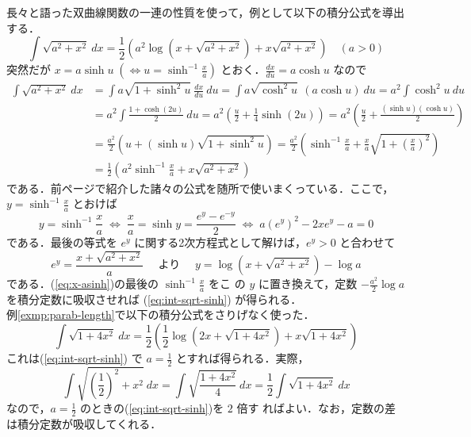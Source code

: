 \documentclass[10pt, uplatex, dvipdfmx]{jsarticle}
\theoremstyle{definition}
\numberwithin{equation}{section}
\newcommand{\ds}{\displaystyle}
\begin{document}
長々と語った双曲線関数の一連の性質を使って，例として以下の積分公式を導出する．
\begin{equation}\label{eq:int-sqrt-sinh}
  \int \sqrt{a^2+x^2} \ dx = \frac{1}{2}\left( a^2 \log \left(x+\sqrt{a^2+x^2}\right) + x \sqrt{a^2+x^2} \right) \quad (a>0)
\end{equation}
突然だが
$\ds x= a \sinh u \; \left( \Leftrightarrow u =
  \sinh^{-1}\frac{x}{a}\right)$ とおく．$\ds \frac{dx}{du} = a \cosh
u$ なので
\begin{equation}\label{eq:x-asinh}
  \begin{aligned}
    \int \sqrt{a^2+x^2} \ dx
    &= \int a \sqrt{1+\sinh^2 u}~ \frac{dx}{du}\ du
      = \int a \sqrt{\cosh^2 u}~ \left( a \cosh u\right) \ du
      = a^2 \int \cosh^2 u \ du\\[1ex]
    &= a^2 \int \frac{1+\cosh(2u)}{2} \ du = a^2\left( \frac{u}{2} + \frac{1}{4}\sinh(2u) \right)
      = a^2 \left( \frac{u}{2} + \frac{(\sinh u)(\cosh u)}{2}\right)\\[1ex]
    & = \frac{a^2}{2}\left( u + \left( \sinh u\right) \sqrt{1+\sinh^2 u}\right)
      =\frac{a^2}{2}\left( \sinh^{-1}\frac{x}{a} + \frac{x}{a} \sqrt{1+ \left(\frac{x}{a}\right)^2}\right)\\[1ex]
    & = \frac{1}{2}\left( a^2 \sinh^{-1}\frac{x}{a} + x \sqrt{a^2+x^2}\right)
  \end{aligned}
\end{equation}
である．前ページで紹介した諸々の公式を随所で使いまくっている．ここで，$\ds y=\sinh^{-1}\frac{x}{a}$ とおけば
\[
  y = \sinh^{-1}\frac{x}{a} \; \Longleftrightarrow \; \frac{x}{a} =
  \sinh y = \frac{e^{y}-e^{-y}}{2} \; \Longleftrightarrow \;
  a \left( e^y\right)^2 -2x e^y - a=0
\]
である．最後の等式を $e^y$ に関する2次方程式として解けば，$e^y >0$ と合わせて
\[
  e^y = \frac{x + \sqrt{a^2+x^2}}{a} \quad \text{ より }  \quad y = \log \left( x + \sqrt{a^2+x^2}\right) - \log a
\]
である．(\ref{eq:x-asinh})の最後の $\ds \sinh^{-1}\frac{x}{a}$ をこ
の $y$ に置き換えて，定数 $\ds -\frac{a^2}{2}\log a$ を積分定数に吸収させれば (\ref{eq:int-sqrt-sinh}) が得られる．\\

例\ref{exmp:parab-length}で以下の積分公式をさりげなく使った．
\[
  \int \sqrt{1+4x^2} \ dx = \frac{1}{2}\left(\frac{1}{2} \log \left( 2x + \sqrt{1+4x^2}\right) + x \sqrt{1+4x^2}\right)
\]
これは(\ref{eq:int-sqrt-sinh}) で $\ds a=\frac{1}{2}$ とすれば得られる．実際，
\[
  \int \sqrt{ \left( \frac{1}{2}\right)^2 + x^2 } \ dx = \int
  \sqrt{\frac{1+4x^2}{4}} \ dx = \frac{1}{2}\int \sqrt{1+4x^2} \ dx
\]
なので，$\ds a=\frac{1}{2}$ のときの(\ref{eq:int-sqrt-sinh})を $2$ 倍す
ればよい．なお，定数の差は積分定数が吸収してくれる．\\
\end{document}
